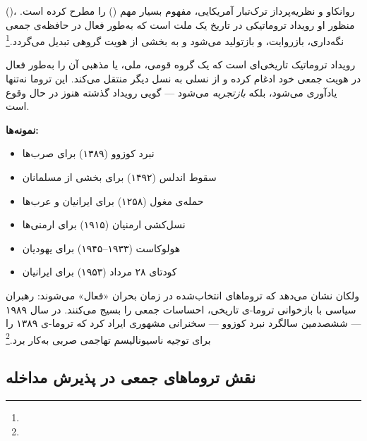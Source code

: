  ()، روانکاو و نظریه‌پرداز ترک‌تبار آمریکایی، مفهوم بسیار مهم  () را مطرح کرده است. منظور او رویداد تروماتیکی در تاریخ یک ملت است که به‌طور فعال در حافظه‌ی جمعی نگه‌داری، بازروایت، و بازتولید می‌شود و به بخشی از هویت گروهی تبدیل می‌گردد.\footnote{}

\begin{tcolorbox}[defbox, title={تعریف: تروما-ی انتخاب‌شده}]
 رویداد تروماتیک تاریخی‌ای است که یک گروه قومی، ملی، یا مذهبی آن را به‌طور فعال در هویت جمعی خود ادغام کرده و از نسلی به نسل دیگر منتقل می‌کند. این تروما نه‌تنها یادآوری می‌شود، بلکه \textit{بازتجربه} می‌شود — گویی رویداد گذشته هنوز در حال وقوع است.

\textbf{نمونه‌ها:}
\begin{itemize}
\item نبرد کوزوو (۱۳۸۹) برای صرب‌ها
\item سقوط اندلس (۱۴۹۲) برای بخشی از مسلمانان
\item حمله‌ی مغول (۱۲۵۸) برای ایرانیان و عرب‌ها
\item نسل‌کشی ارمنیان (۱۹۱۵) برای ارمنی‌ها
\item هولوکاست (۱۹۳۳–۱۹۴۵) برای یهودیان
\item کودتای ۲۸ مرداد (۱۹۵۳) برای ایرانیان
\end{itemize}
\end{tcolorbox}

ولکان نشان می‌دهد که تروماهای انتخاب‌شده در زمان بحران «فعال» می‌شوند: رهبران سیاسی با بازخوانی تروما-ی تاریخی، احساسات جمعی را بسیج می‌کنند.  در سال ۱۹۸۹ — ششصدمین سالگرد نبرد کوزوو — سخنرانی مشهوری ایراد کرد که تروما-ی ۱۳۸۹ را برای توجیه ناسیونالیسم تهاجمی صربی به‌کار برد.\footnote{}

\subsection{نقش تروماهای جمعی در پذیرش مداخله}
\label{subsec:ch11-trauma-intervention}

